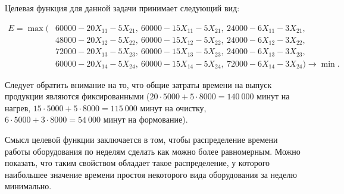 Целевая функция для данной задачи принимает следующий вид:
\begin{small}
  \begin{align*}
    E = \max( 
      & 60000 - 20X_{11} - 5X_{21}, \: 60000 - 15X_{11} - 5X_{21}, \: 24000 - 6X_{11} - 3X_{21}, \\
      & 48000 - 20X_{12} - 5X_{22}, \: 60000 - 15X_{12} - 5X_{22}, \: 24000 - 6X_{12} - 3X_{22}, \\
      & 72000 - 20X_{13} - 5X_{23}, \: 60000 - 15X_{13} - 5X_{23}, \: 24000 - 6X_{13} - 3X_{23}, \\  
      & 60000 - 20X_{14} - 5X_{24}, \: 60000 - 15X_{14} - 5X_{24}, \: 72000 - 6X_{14} - 3X_{24} ) \rightarrow \min.
  \end{align*}
\end{small}

\vspace{-7mm}

Следует обратить внимание на то, что общие затраты времени на выпуск
продукции являются фиксированными
(\( 20 \cdot 5000 + 5 \cdot 8000 = 140~000 \) минут на нагрев,
 \( 15 \cdot 5000 + 5 \cdot 8000 = 115~000 \) минут на очистку,
 \( 6  \cdot 5000 + 3 \cdot 8000 = 54~000  \) минут на формование).

Смысл целевой функции заключается в том, чтобы распределение времени работы
оборудования по неделям сделать как можно более равномерным. 
Можно показать, что таким свойством обладает такое распределение, 
у которого наибольшее значение времени простоя некоторого вида
оборудования за неделю минимально.